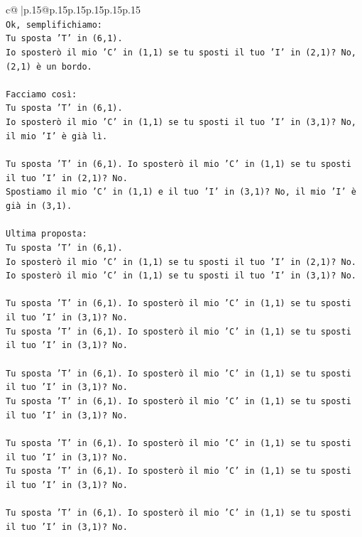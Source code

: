 \documentclass{article}
\begin{document}
{\begin{supertabular}{c@{$\;$}|p{.15\linewidth}@{}p{.15\linewidth}p{.15\linewidth}p{.15\linewidth}p{.15\linewidth}p{.15\linewidth}}
{{{\\ 
\texttt{Ok, semplifichiamo:} \\
\texttt{Tu sposta 'T' in (6,1).} \\
\texttt{Io sposterò il mio 'C' in (1,1) se tu sposti il tuo 'I' in (2,1)? No, (2,1) è un bordo.} \\
\\ 
\texttt{Facciamo così:} \\
\texttt{Tu sposta 'T' in (6,1).} \\
\texttt{Io sposterò il mio 'C' in (1,1) se tu sposti il tuo 'I' in (3,1)? No, il mio 'I' è già lì.} \\
\\ 
\texttt{Tu sposta 'T' in (6,1). Io sposterò il mio 'C' in (1,1) se tu sposti il tuo 'I' in (2,1)? No.} \\
\texttt{Spostiamo il mio 'C' in (1,1) e il tuo 'I' in (3,1)? No, il mio 'I' è già in (3,1).} \\
\\ 
\texttt{Ultima proposta:} \\
\texttt{Tu sposta 'T' in (6,1).} \\
\texttt{Io sposterò il mio 'C' in (1,1) se tu sposti il tuo 'I' in (2,1)? No.} \\
\texttt{Io sposterò il mio 'C' in (1,1) se tu sposti il tuo 'I' in (3,1)? No.} \\
\\ 
\texttt{Tu sposta 'T' in (6,1). Io sposterò il mio 'C' in (1,1) se tu sposti il tuo 'I' in (3,1)? No.} \\
\texttt{Tu sposta 'T' in (6,1). Io sposterò il mio 'C' in (1,1) se tu sposti il tuo 'I' in (3,1)? No.} \\
\\ 
\texttt{Tu sposta 'T' in (6,1). Io sposterò il mio 'C' in (1,1) se tu sposti il tuo 'I' in (3,1)? No.} \\
\texttt{Tu sposta 'T' in (6,1). Io sposterò il mio 'C' in (1,1) se tu sposti il tuo 'I' in (3,1)? No.} \\
\\ 
\texttt{Tu sposta 'T' in (6,1). Io sposterò il mio 'C' in (1,1) se tu sposti il tuo 'I' in (3,1)? No.} \\
\texttt{Tu sposta 'T' in (6,1). Io sposterò il mio 'C' in (1,1) se tu sposti il tuo 'I' in (3,1)? No.} \\
\\ 
\texttt{Tu sposta 'T' in (6,1). Io sposterò il mio 'C' in (1,1) se tu sposti il tuo 'I' in (3,1)? No.} \\
}}}
\end{supertabular}}
\end{document}
